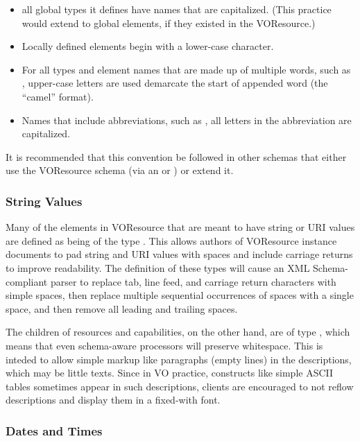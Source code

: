 \documentclass[11pt,a4paper]{ivoa}
\begin{document}
\begin{itemize}
  \item all global types it defines have names that are capitalized.
       (This practice would extend to global elements, if they existed
       in the VOResource.)   
  \item Locally defined elements begin with a lower-case character. 
  \item For all types and element names that are made up of multiple
       words, such as , upper-case letters are
       used demarcate the start of appended word (the ``camel''
       format).  
  \item Names that include abbreviations, such as
       , all letters in the abbreviation are
       capitalized.  
\end{itemize}

It is recommended that this convention be followed in other schemas
that either use the VOResource schema (via an  or
) or extend it.  


\subsubsection{String Values}

Many of the elements in VOResource that are meant to have string or
URI values are defined as being of the type .
This allows authors of VOResource instance documents to pad string and
URI values with spaces and include carriage returns to improve
readability.  The definition of these types will cause an XML
Schema-compliant parser to replace tab, line feed, and carriage return
characters with simple spaces, then replace multiple sequential
occurrences of spaces with a single space, and then remove all leading
and trailing spaces.

The  children of resources and capabilities, on the
other hand, are of type , which means that even
schema-aware processors will preserve whitespace.  This is inteded to
allow simple markup like paragraphs (empty lines) in the descriptions,
which may be little texts.  Since in VO practice, constructs like simple
ASCII tables sometimes appear in such descriptions, clients are
encouraged to not reflow descriptions and display them in a fixed-with
font.


\subsubsection{Dates and Times}
\end{document}
